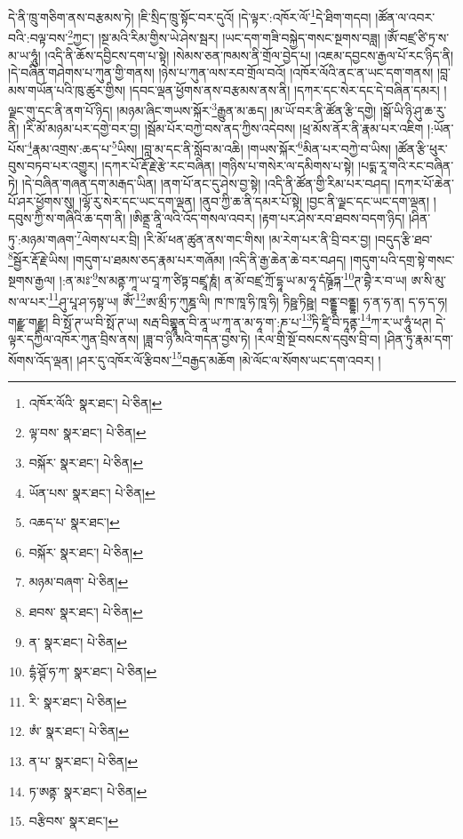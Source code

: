 དེ་ནི་ཁྲུ་གཅིག་ནས་བརྩམས་ཏེ། །ཇི་སྲིད་ཁྲུ་སྟོང་བར་དུའོ། །དེ་ལྟར་:འཁོར་ལོ་\footnote{འཁོར་ལོའི་  སྣར་ཐང་།  པེ་ཅིན། }དེ་ཐིག་གདབ། །ཚོན་ལ་འབར་བའི་:བལྟ་བས་\footnote{ལྟ་བས་  སྣར་ཐང་།  པེ་ཅིན། }ཀྱང་། །སྔ་མའི་རིམ་གྱིས་ཡེ་ཤེས་སྦར། །ཡང་དག་གཟི་བསྐྱེད་གསང་སྔགས་བཟླ། །ཨོཾ་བཛྲ་ཙི་ཏྲ་ས་མ་ཡ་ཧཱུཾ། །འདི་ནི་ཆོས་དབྱིངས་དག་པ་སྟེ། །སེམས་ཅན་ཁམས་ནི་གྲོལ་བྱེད་པ། །འཇམ་དབྱངས་རྒྱལ་པོ་རང་ཉིད་ནི། །དེ་བཞིན་གཤེགས་པ་ཀུན་གྱི་གནས། །ཉེས་པ་ཀུན་ལས་རབ་གྲོལ་བའོ། །འཁོར་ལོའི་ནང་ན་ཡང་དག་གནས། །བླ་མས་གཡོན་པའི་ཁུ་ཚུར་གྱིས། །དབང་ལྡན་ཕྱོགས་ནས་བརྩམས་ནས་ནི། །དཀར་དང་སེར་དང་དེ་བཞིན་དམར། །ལྗང་གུ་དང་ནི་ནག་པོ་ཉིད། །མཉམ་ཞིང་གཡས་སྐོར་\footnote{བསྐོར་  སྣར་ཐང་།  པེ་ཅིན། }རྒྱུན་མ་ཆད། །མ་ཡོ་བར་ནི་ཚོན་རྩི་དགྱེ། །སྒོ་ཡི་ཉི་ཤུ་ཆ་རུ་ནི། །རི་མོ་མཉམ་པར་དགྱེ་བར་བྱ། །སྦོམ་པོར་བཀྱེ་བས་ནད་ཀྱིས་འདེབས། །ཕྲ་མོས་ནོར་ནི་རྣམ་པར་འཇིག །:ཡོན་པོས་\footnote{ཡོན་པས་  སྣར་ཐང་།  པེ་ཅིན། }རྣམ་འགྲས་:ཆད་པ་\footnote{འཆད་པ་  སྣར་ཐང་། }ཡིས། །བླ་མ་དང་ནི་སློབ་མ་འཆི། །གཡས་སྐོར་\footnote{བསྐོར་  སྣར་ཐང་།  པེ་ཅིན། }མིན་པར་བཀྱེ་བ་ཡིས། །ཚོན་རྩི་ཕུར་བུས་བཏབ་པར་འགྱུར། །དཀར་པོ་རྡོ་རྗེ་རྩེ་རང་བཞིན། །གཉིས་པ་གསེར་ལ་དམིགས་པ་སྟེ། །པདྨ་རཱ་གའི་རང་བཞིན་ཏེ། །དེ་བཞིན་གཞན་དག་མརྒད་ཡིན། །ནག་པོ་ནང་དུ་ཤེས་བྱ་སྟེ། །འདི་ནི་ཚོན་གྱི་རིམ་པར་བཤད། །དཀར་པོ་ཆེན་པོ་ཤར་ཕྱོགས་སུ། །ལྷོ་རུ་སེར་དང་ཡང་དག་ལྡན། །ནུབ་ཀྱི་ཆ་ནི་དམར་པོ་སྟེ། །བྱང་ནི་ལྗང་དང་ཡང་དག་ལྡན། །དབུས་ཀྱི་ས་གཞིའི་ཆ་དག་ནི། །ཨིནྡྲ་ནཱི་ལའི་འོད་གསལ་འབར། །རྟག་པར་ཤེས་རབ་ཐབས་བདག་ཉིད། །ཤིན་ཏུ་:མཉམ་གཞག་\footnote{མཉམ་བཞག་  པེ་ཅིན། }ལེགས་པར་བྲི། །རི་མོ་ཕན་ཚུན་ནས་གང་གིས། །མ་རེག་པར་ནི་བྲི་བར་བྱ། །བདུད་རྩི་ཐབ་\footnote{ཐབས་  སྣར་ཐང་།  པེ་ཅིན། }སྦྱོར་རྡོ་རྗེ་ཡིས། །གདུག་པ་ཐམས་ཅད་རྣམ་པར་གཞོམ། །འདི་ནི་རྒྱ་ཆེན་ཆེ་བར་བཤད། །གདུག་པའི་དགྲ་སྟེ་གསང་སྔགས་རྒྱལ། །:ན་མཿ་\footnote{ན་  སྣར་ཐང་།  པེ་ཅིན། }ས་མནྟ་ཀཱ་ཡ་བཱ་ཀ་ཙིཏྟ་བཛྲཱ་ཎཱཾ། ན་མོ་བཛྲ་ཀྲོ་དྷཱ་ཡ་མ་ཧཱ་དཾཥྚྲོཏྐ་\footnote{དྷཾ་ཤྚོ་ཧ་ཀ་  སྣར་ཐང་།  པེ་ཅིན། }ཊ་བྷཻ་ར་བ་ཡ། ཨ་སི་མུ་ས་ལ་པར་\footnote{རི་  སྣར་ཐང་།  པེ་ཅིན། }ཤུ་པཱ་ཤ་ཧསྟ་ཡ། ཨོཾ་\footnote{ཨཾ་  སྣར་ཐང་།  པེ་ཅིན། }ཨ་མྲྀ་ཏ་ཀུཎྜ་ལི། ཁ་ཁ་ཁཱ་ཧི་ཁཱ་ཧི། ཏིཥྛ་ཏིཥྛ། བནྡྷ་བནྡྷ། ཧ་ན་ཧ་ན། ད་ཧ་ད་ཧ། གརྫྫ་གརྫྫ། བི་སྥོ་ཊ་ཡ་བི་སྥོ་ཊ་ཡ། སརྦ་བིགྷྣཱན་བི་ནཱ་ཡ་ཀཱ་ན་མ་ཧཱ་ག་:ཎ་པ་\footnote{ན་པ་  སྣར་ཐང་།  པེ་ཅིན། }ཏི་ཛཱི་བི་ཏཱནྟ་\footnote{ཏ་ཨནྟ་  སྣར་ཐང་།  པེ་ཅིན། }ཀ་ར་ཡ་ཧཱུཾ་ཕཊ། དེ་ལྟར་དཀྱིལ་འཁོར་ཀུན་བྲིས་ནས། །ཟླ་བ་ཉི་མའི་གདན་བྱས་ཏེ། །རལ་གྲི་སྔོ་བསངས་དབུས་བྲི་བ། །ཤིན་ཏུ་རྣམ་དག་སོགས་འོད་ལྡན། །ཤར་དུ་འཁོར་ལོ་རྩིབས་\footnote{བརྩིབས་  སྣར་ཐང་། }བརྒྱད་མཆོག །མེ་ལོང་ལ་སོགས་ཡང་དག་འབར། །

